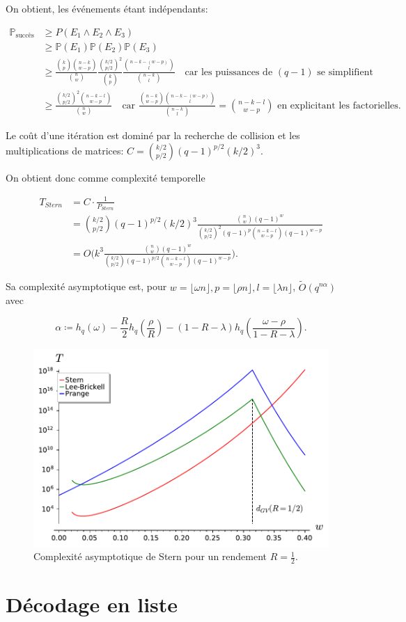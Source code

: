 \documentclass{scrartcl}[a4paper,10pt,headings=small,footinclude=false]
\theoremstyle{definition}
\theoremstyle{remark}
\begin{document}
On obtient, les événements étant indépendants:

\begin{align*}
\mathbb{P}_{\text{succès}} &\geq P(E_1 \wedge E_2 \wedge E_3)\\
&\geq \mathbb{P}(E_1) \mathbb{P}(E_2) \mathbb{P}(E_3)\\
&\geq \frac{\binom{k}{p}\binom{n-k}{w-p}}{\binom{n}{w}} \frac{\binom{k/2}{p/2}^2}{\binom{k}{p}} \frac{\binom{n-k-(w-p)}{l}}{\binom{n-k}{l}} \quad \text{car les puissances de } (q-1) \text{ se simplifient}\\
&\geq \frac{\binom{k/2}{p/2}^2\binom{n-k-l}{w-p}}{\binom{n}{w}} \quad \text{car } \frac{\binom{n-k}{w-p}\binom{n-k-(w-p)}{l}}{\binom{n-k}{l}} = \binom{n-k-l}{w-p} \text{ en explicitant les factorielles}.
\end{align*}

Le coût d'une itération est dominé par la recherche de collision et les multiplications de matrices: $C=\binom{k/2}{p/2}(q-1)^{p/2}(k/2)^3$.

On obtient donc comme complexité temporelle

\begin{align*}
	T_{Stern} &= C \cdot \frac{1}{P_{Stern}}\\
	&= \binom{k/2}{p/2}(q-1)^{p/2}(k/2)^3 \frac{\binom{n}{w}(q-1)^w}{\binom{k/2}{p/2}^2 (q-1)^p \binom{n-k-l}{w-p}(q-1)^{w-p}}\\
	&= O\Big(k^3 \frac{\binom{n}{w}(q-1)^w}{\binom{k/2}{p/2} (q-1)^{p/2} \binom{n-k-l}{w-p}(q-1)^{w-p}}\Big).
\end{align*}

Sa complexité asymptotique est, pour $w=\lfloor \omega n \rfloor, p = \lfloor \rho n \rfloor, l= \lfloor \lambda  n \rfloor$, $\tilde{O}(q^{n\alpha})$ avec

\[
	\alpha \coloneq h_q(\omega)-\frac{R}{2} h_q(\frac{\rho}{R}) - (1-R-\lambda)h_q(\frac{\omega - \rho}{1 - R - \lambda}).
\]

\begin{figure}[h!]
\centering
\includegraphics{decodage_syndrome/Stern.pdf}
\caption{Complexité asymptotique de Stern pour un rendement $R=\frac{1}{2}$.}
\label{fig:prange}
\end{figure}


\newpage
\section{Décodage en liste}
\end{document}
